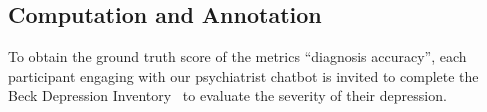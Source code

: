 



\subsection{Computation and Annotation}

To obtain the ground truth score of the metrics ``diagnosis accuracy'', each participant engaging with our psychiatrist chatbot is invited to complete the Beck Depression Inventory~\cite{beck1996beck} to evaluate the severity of their depression.

